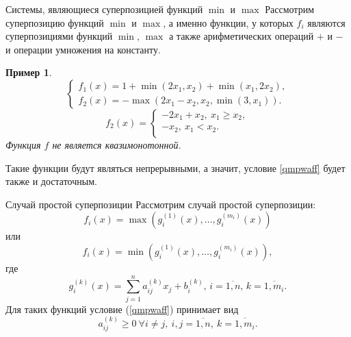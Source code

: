 \documentclass[envcountsect]{beamer}
\newtheorem*{ruexample}{Пример}
\theoremstyle{definition}
\begin{document}
	\begin{frame}{Системы, являющиеся суперпозицией функций \(\min\) и \(\max\)}
		Рассмотрим суперпозицию функций \(\min\) и \(\max\), а именно функции, у которых \(f_i\) являются суперпозициями функций \(\min\), \(\max\) а также арифметических операций \(+\) и \(-\) и операции умножения на константу.
		\begin{ruexample}
			\[\begin{cases}
				f_1(x) = 1 + \min(2x_1,x_2) + \min(x_1, 2x_2), \\
				f_2(x) = -\max(2x_1 - x_2, x_2, \min(3, x_1)).
			\end{cases}\]
			\[
			f_2(x) = \begin{cases}
				-2x_1 + x_2,\ x_1 \ge x_2,\\
				-x_2,\ x_1 < x_2. \\
			\end{cases}
			\]
			Функция \(f\) не является квазимонотонной.
		\end{ruexample}
		Такие функции будут являться непрерывными, а значит, условие \ref{qmpwaff} будет также и достаточным. 
	\end{frame}
	
	\begin{frame}{Случай простой суперпозиции}
		Рассмотрим случай простой суперпозиции:
		\[f_i(x) = \max(g_i^{(1)}(x),\dots,g_i^{(m_i)}(x))\]
		или
		\[f_i(x) = \min(g_i^{(1)}(x),\dots,g_i^{(m_i)}(x)),\]
		где
		\[g_i^{(k)}(x) = \sum_{j=1}^n a_{ij}^{(k)} x_j + b_i^{(k)},\, i = \overline{1, n},\, k = \overline{1, m_i}.\]
		Для таких функций условие (\ref{qmpwaff}) принимает вид
		\begin{equation} \label{qmmm}
			a_{ij}^{(k)} \ge 0\ \forall i \neq j,\ i,j = \overline{1, n},\ k = \overline{1, m_i}.
		\end{equation}
	\end{frame}

	
\end{document}
